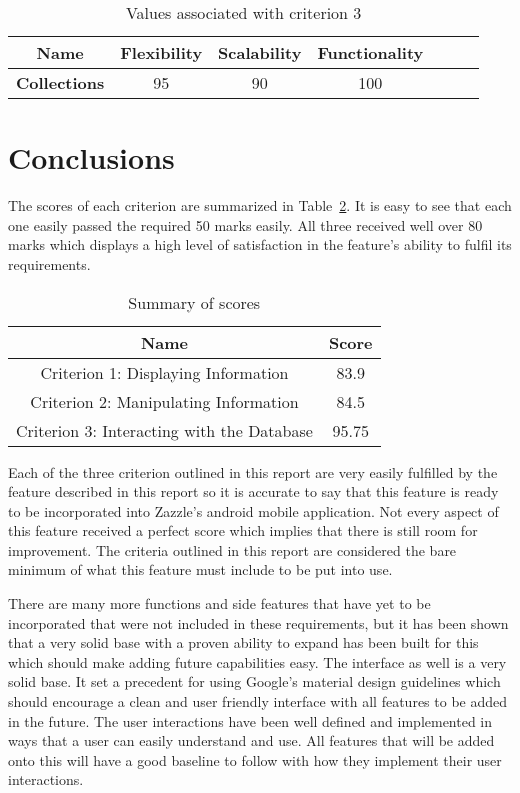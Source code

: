 \documentclass[12pt]{article}
\begin{document}
\begin{table}[h!]
\centering
	\begin{tabular}{|c|c|c|c|c|c|c|} 
		\hline
		\textbf{Name} & \textbf{Flexibility} & \textbf{Scalability} & \textbf{Functionality}\\
		\hline
		\textbf{Collections} 			& 95 & 90 & 100\\
		\hline
	\end{tabular}
\caption{Values associated with criterion 3}
\label{table:6}
\end{table}



\section{Conclusions}

The scores of each criterion are summarized in Table~\ref{table:7}. It is easy to see that each one easily passed the required 50 marks easily. All three received well over 80 marks which displays a high level of satisfaction in the feature's ability to fulfil its requirements.

\begin{table}[h!]
\centering
	\begin{tabular}{|c|c|} 
		\hline
		\textbf{Name} & \textbf{Score}\\
		\hline
		Criterion 1: Displaying Information 			& 83.9\\
		\hline
		Criterion 2: Manipulating Information 			& 84.5\\
		\hline
		Criterion 3: Interacting with the Database 	& 95.75\\
		\hline
	\end{tabular}
\caption{Summary of scores}
\label{table:7}
\end{table}


Each of the three criterion outlined in this report are very easily fulfilled by the feature described in this report so it is accurate to say that this feature is ready to be incorporated into Zazzle's android mobile application. Not every aspect of this feature received a perfect score which implies that there is still room for improvement. The criteria outlined in this report are considered the bare minimum of what this feature must include to be put into use. 

There are many more functions and side features that have yet to be incorporated that were not included in these requirements, but it has been shown that a very solid base with a proven ability to expand has been built for this which should make adding future capabilities easy. The interface as well is a very solid base. It set a precedent for using Google's material design guidelines which should encourage a clean and user friendly interface with all features to be added in the future. The user interactions have been well defined and implemented in ways that a user can easily understand and use. All features that will be added onto this will have a good baseline to follow with how they implement their user interactions. 
\end{document}
